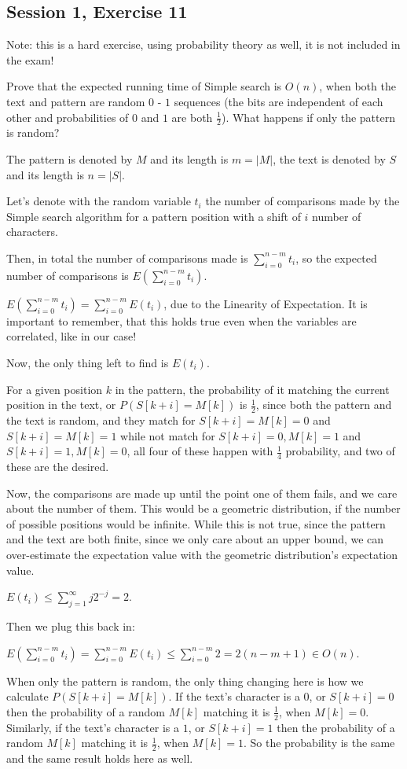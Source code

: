 \subsection{Session 1, Exercise 11}

Note: this is a hard exercise, using probability theory as well, it is not included in the exam!


Prove that the expected running time of Simple search is $O(n)$, when both the text and pattern are random $0$ - $1$ sequences (the bits are independent of each other and probabilities of $0$ and $1$ are both $\frac{1}{2}$). What happens if only the pattern is random?


The pattern is denoted by $M$ and its length is $m=|M|$, the text is denoted by $S$ and its length is $n=|S|$.

Let's denote with the random variable $t_i$ the number of comparisons made by the Simple search algorithm for a pattern position with a shift of $i$ number of characters.

Then, in total the number of comparisons made is $\sum\limits_{i=0}^{n-m}t_i$, so the expected number of comparisons is $E(\sum\limits_{i=0}^{n-m}t_i)$.

$E(\sum\limits_{i=0}^{n-m}t_i) = \sum\limits_{i=0}^{n-m}E(t_i)$, due to the Linearity of Expectation. It is important to remember, that this holds true even when the variables are correlated, like in our case!

Now, the only thing left to find is $E(t_i)$.

For a given position $k$ in the pattern, the probability of it matching the current position in the text, or $P(S[k+i] = M[k])$ is $\frac{1}{2}$, since both the pattern and the text is random, and they match for $S[k+i] = M[k] = 0$ and $S[k+i] = M[k] = 1$ while not match for $S[k+i] = 0, M[k] = 1$ and $S[k+i] = 1, M[k] = 0$, all four of these happen with $\frac{1}{4}$ probability, and two of these are the desired.

Now, the comparisons are made up until the point one of them fails, and we care about the number of them. This would be a geometric distribution, if the number of possible positions would be infinite. While this is not true, since the pattern and the text are both finite, since we only care about an upper bound, we can over-estimate the expectation value with the geometric distribution's expectation value.

$E(t_i) \leq{} \sum\limits_{j=1}^{\infty}j2^{-j} = 2$.

Then we plug this back in:

$E(\sum\limits_{i=0}^{n-m}t_i) = \sum\limits_{i=0}^{n-m}E(t_i) \leq{} \sum\limits_{i=0}^{n-m}2 = 2(n-m+1) \in{} O(n)$.

When only the pattern is random, the only thing changing here is how we calculate $P(S[k+i] = M[k])$. If the text's character is a $0$, or $S[k+i]=0$ then the probability of a random $M[k]$ matching it is $\frac{1}{2}$, when $M[k]=0$. Similarly, if the text's character is a $1$, or $S[k+i]=1$ then the probability of a random $M[k]$ matching it is $\frac{1}{2}$, when $M[k]=1$. So the probability is the same and the same result holds here as well.